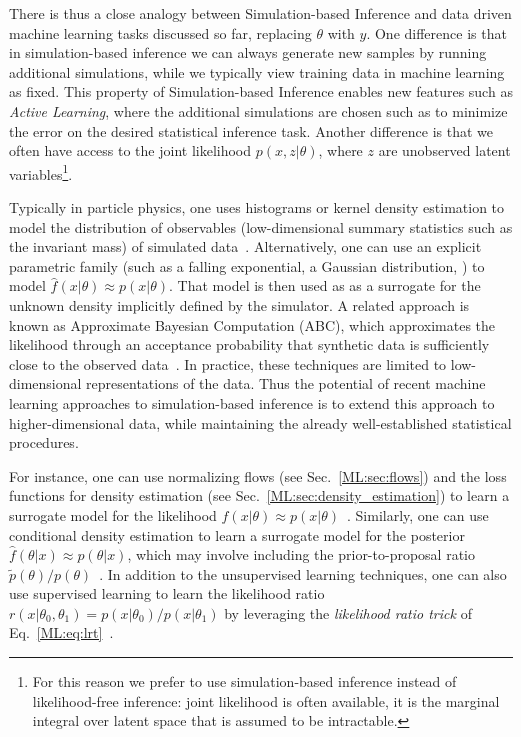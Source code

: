 There is thus a close analogy between 
Simulation-based Inference and 
data driven machine learning tasks discussed so far, replacing 
$\theta$ with $y$. One difference
is that in simulation-based inference we can always generate new 
samples by running additional simulations, 
while we typically view training data in machine 
learning as fixed. This property of 
Simulation-based Inference enables new 
features such as \textit{Active Learning}, 
where the additional simulations are 
chosen such as to minimize the error 
on the desired statistical inference task.
Another difference is that we often
have access to the joint likelihood 
$p(x,z|\theta)$, where $z$ are unobserved
latent variables\footnote{For this reason we prefer to use simulation-based inference instead of likelihood-free inference: joint likelihood is often available, it is the 
marginal integral over latent space that is assumed to be intractable.}. 




Typically in particle physics, one uses histograms or kernel density estimation to model the distribution of observables (low-dimensional summary statistics such as the invariant mass) of simulated data~\cite{Diggle1984MonteCM}. Alternatively, one can use an explicit parametric family (such as a falling exponential, a Gaussian distribution, \etc) to model $\hat{f}(x |\theta) \approx p(x | \theta)$. That model is then used as as a surrogate for the unknown density implicitly defined by the simulator. A related approach is known as Approximate Bayesian Computation (ABC), which approximates the likelihood through an acceptance probability that synthetic data is sufficiently close to the observed data~\cite{rubin1984, beaumont2002approximate}. In practice, these techniques are limited to low-dimensional representations of the data. Thus the potential of recent machine learning approaches to simulation-based inference is to extend this approach to higher-dimensional data, while maintaining the already well-established statistical procedures. 

For instance, one can use normalizing flows (see Sec.~\ref{ML:sec:flows}) and the loss functions for density estimation (see Sec.~\ref{ML:sec:density_estimation}) to learn a surrogate model for the likelihood $\hat{f}(x |\theta) \approx p(x | \theta)$~\cite{Cranmer:2016lzt}. Similarly, one can use conditional density estimation to learn a surrogate model for the posterior $\hat{f}(\theta | x) \approx p(\theta |x)$, which may involve including the prior-to-proposal ratio $\tilde{p}(\theta)/p(\theta)$~\cite{NIPS2016_6084}. In addition to the unsupervised learning techniques, one can also use supervised learning to learn the likelihood ratio $r(x| \theta_0, \theta_1) = p(x|\theta_0)/p(x|\theta_1)$ by leveraging the \textit{likelihood ratio trick} of Eq.~\ref{ML:eq:lrt}~\cite{Cranmer:2015bka,Brehmer:2018hga}. 

